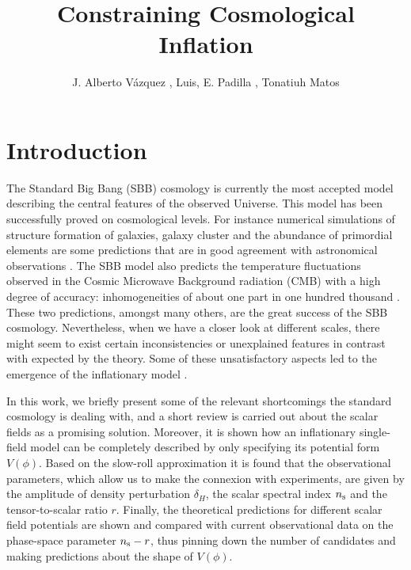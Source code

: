 \documentclass{rmaa}
\title{Constraining Cosmological Inflation}
\author{
J. Alberto V\'azquez \altaffilmark{1}, Luis, E. Padilla \altaffilmark{2,3}, Tonatiuh Matos \altaffilmark{2,3}}
\begin{document}

  \maketitle

\section{Introduction}

The Standard Big Bang (SBB) cosmology is currently the most accepted model describing 
the central features of the observed Universe. This model has been successfully proved on 
cosmological levels. For instance numerical simulations of structure formation of galaxies,
galaxy cluster and the abundance of primordial elements are some predictions that 
are in good agreement with astronomical observations \citep{Kolbbo, Teg, Sping}. 
The SBB model also predicts the temperature fluctuations observed in the Cosmic 
Microwave Background radiation (CMB) with a high degree of accuracy: 
inhomogeneities of about one part in one hundred thousand \citep{Komat,Planckxvi} .
 These two predictions, amongst many others, are the great success of 
the SBB cosmology. Nevertheless, %
when we have a closer look at different scales, there might seem to exist certain 
inconsistencies or unexplained features in contrast   with expected by 
the theory. Some of these unsatisfactory aspects led to the 
emergence of the inflationary model \citep{Guth, Linde, Linde2, Steinhardt}.

In this work, we briefly present some of the relevant shortcomings the standard 
cosmology is dealing with, and a short review is carried out about the scalar fields as  a
promising solution. Moreover, it is shown how an inflationary single-field model can be 
completely described by only specifying its potential form $V(\phi)$. 
Based on the slow-roll approximation it is found that the observational parameters, 
which allow us to make the connexion with experiments, are given by 
the amplitude of density perturbation $\delta_H$, the scalar spectral index $n_{\rm s}$
and the tensor-to-scalar ratio $r$.
Finally, the theoretical predictions for different scalar field potentials are shown and 
compared with current observational data on the phase-space parameter $n_{\rm s}-r$, 
thus pinning down the number of candidates and making predictions about the shape of $V(\phi)$. 
\end{document}
